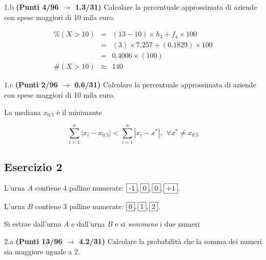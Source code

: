 \documentclass[
  11pt,
]{book}
\theoremstyle{mytheoremstyle}
\theoremstyle{mydefstyle}
\newenvironment{sol}
  {
  \begin{tcolorbox}[enhanced,breakable,arc=0.1mm,boxrule=1pt,colback=white,colframe=iblue,
  title=\bf \fontfamily{lmss}\selectfont \hspace{.5 cm} Soluzione,drop fuzzy shadow]

}{
\end{tcolorbox}
  }
\begin{document}
1.b \textbf{(Punti 4/96 \(\rightarrow\) 1.3/31)} Calcolare la percentuale approssimata di aziende
con spese maggiori di 10 mila euro.

\begin{sol}
\begin{eqnarray*}
     \%(X> 10 ) &=& ( 13 - 10 )\times h_{ 3 }+ f_{ 4 }\times 100 \\
              &=& ( 3 )\times 7.257 + ( 0.1829 )\times 100 \\
              &=&  0.4006 \times(100)\\
     \#(X> 10 ) &\approx& 140 
         \end{eqnarray*}

\end{sol}

1.c \textbf{(Punti 2/96 \(\rightarrow\) 0.6/31)} Calcolare la percentuale approssimata di aziende
con spese maggiori di 10 mila euro.

\begin{sol}
La mediana \(x_{0.5}\) è il minimante

\[
\sum_{i=1}^n|x_i-x_{0.5}|<\sum_{i=1}^n|x_i-x^*|, ~~\forall x^*\neq x_{0.5}
\]

\end{sol}

\subsection{Esercizio 2}\label{esercizio-2-5}

L'urna \(A\) contiene 4 palline numerate: \(\fbox{-1},\fbox{0},\fbox{0},\fbox{+1}\).

L'urna \(B\) contiene 3 palline numerate: \(\fbox{0},\fbox{1},\fbox{2}\).

Si estrae dall'urna \(A\) e dall'urna \(B\) e si \emph{sommano} i due numeri

2.a \textbf{(Punti 13/96 \(\rightarrow\) 4.2/31)} Calcolare la probabilità che la somma dei numeri sia maggiore uguale a 2.
\end{document}
